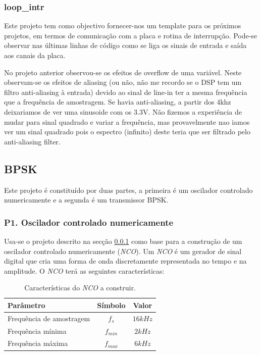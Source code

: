 \documentclass[11pt]{article}
\begin{document}
\subsubsection{loop\_intr}
\label{sec:loop}
Este projeto tem como objectivo fornecer-nos um template para os próximos projetos, em termos de comunicação com a placa e rotina de interrupção. Pode-se observar nas últimas linhas de código como se liga os sinais de entrada e saída aos canais da placa.

No projeto anterior observou-se os efeitos de overflow de uma variável. Neste observam-se os efeitos de aliasing (ou não, não me recordo se o DSP tem um filtro anti-aliasing à entrada)  devido ao sinal de line-in ter a mesma frequência que a frequência de amostragem. Se havia anti-aliasing, a partir dos 4khz deixariamos de ver uma sinusoide com os 3.3V. Não fizemos a experiência de mudar para sinal quadrado e variar a frequência, mas provavelmente nao iamos ver um sinal quadrado pois o espectro (infinito) deste teria que ser filtrado pelo anti-aliasing filter.


\subsection{BPSK}
Este projeto é constituído por duas partes, a primeira é um oscilador controlado numericamente e a segunda é um transmissor BPSK.

\subsubsection{P1. Oscilador controlado numericamente}

Usa-se o projeto descrito na secção \ref{sec:loop} como base para a construção de um oscilador controlado numericamente (\textit{NCO}). Um \textit{NCO} é um gerador de sinal digital que cria uma forma de onda discretamente representada no tempo e na amplitude. O \textit{NCO} terá as seguintes características:

\begin{table}[H]
	\centering
	\caption{Características do \textit{NCO} a construir.}
	\label{tab:NCO-car}
\begin{tabular}[c]{|l||c|c|}
	\hline \textbf{Parâmetro} & \textbf{Símbolo} & \textbf{Valor} \\ 
	\hline Frequência de amostragem & $ f_{s} $ & $ 16 kHz $ \\ 
	\hline Frequência mínima & $ f_{min} $ & $ 2 kHz $ \\ 
	\hline Frequência máxima & $ f_{max} $ & $ 6 kHz $ \\ 
	\hline
\end{tabular}
\end{table}
\end{document}
